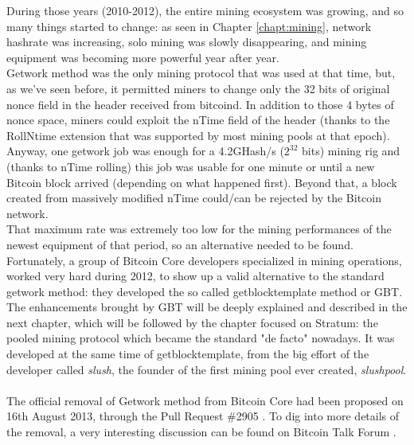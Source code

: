 During those years (2010-2012), the entire mining ecosystem was growing, and so many things started to change: as seen in Chapter \ref{chapt:mining}, network hashrate was increasing, solo mining was slowly disappearing, and mining equipment was becoming more powerful year after year.\\
Getwork method was the only mining protocol that was used at that time, but, as we've seen before, it permitted miners to change only the 32 bits of original nonce field in the header received from bitcoind. In addition to those 4 bytes of nonce space, miners could exploit the nTime field of the header (thanks to the RollNtime extension that was supported by most mining pools at that epoch). 
Anyway, one getwork job was enough for a 4.2GHash/s (${2^{32}}$ bits) mining rig and (thanks to nTime rolling) this job was usable for one minute or until a new Bitcoin block arrived (depending on what happened first). Beyond that, a block created from massively modified nTime could/can be rejected by the Bitcoin network.\\
That maximum rate was extremely too low for the mining performances of the newest equipment of that period, so an alternative needed to be found.
Fortunately, a group of Bitcoin Core developers specialized in mining operations, worked very hard during 2012, to show up a valid alternative to the standard getwork method: they developed the so called getblocktemplate method or GBT.\\
The enhancements brought by GBT will be deeply explained and described in the next chapter, which will be followed by the chapter focused on Stratum: the pooled mining protocol which became the standard "de facto" nowadays. It was developed at the same time of getblocktemplate, from the big effort of the developer called \textit{slush}, the founder of the first mining pool ever created, \textit{slushpool}.\\\\
The official removal of Getwork method from Bitcoin Core had been proposed on 16th August 2013, through the Pull Request \#2905 \cite{bitcoincorepull2905}.
To dig into more details of the removal, a very interesting discussion can be found on Bitcoin Talk Forum \cite{bitcointalkRFCRemoval}.
